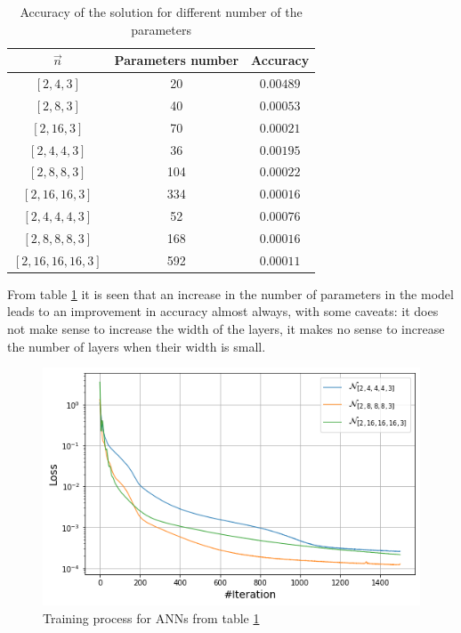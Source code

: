 \begin{table}
	\centering
	\begin{tabular}{| c | c | c |} 
	\hline
		$\vec{n}$ & Parameters number & Accuracy \\ \hline
		$[2, 4, 3]$ & 20 & $0.00489$ \\ \hline
		$[2, 8, 3]$ & 40 & $0.00053$ \\ \hline
		$[2, 16, 3]$ & 70 & $0.00021$ \\ \hline
		$[2, 4, 4, 3]$ & 36 & $0.00195$ \\ \hline
		$[2, 8, 8, 3]$ & 104 & $0.00022$ \\ \hline
		$[2, 16, 16, 3]$ & 334 & $0.00016$ \\ \hline
		$[2, 4, 4, 4, 3]$ & 52 & $0.00076$ \\ \hline
		$[2, 8, 8, 8, 3]$ & 168 & $0.00016$ \\ \hline
		$[2, 16, 16, 16, 3]$ & 592 & $0.00011$ \\ \hline
	\end{tabular}
	\caption{Accuracy of the solution for different number of the parameters}
	\label{table:stokes_tab}
\end{table}

From table \ref{table:stokes_tab} it is seen that an increase in the number of parameters in the model leads to an improvement in accuracy almost always, with some caveats: it does not make sense to increase the width of the layers, it makes no sense to increase the number of layers when their width is small.

\begin{figure}
	\centering
	\includegraphics[width=\textwidth]{images/chapter3/stokes_simple_nets_train.png}
	\caption{Training process for ANNs from table \ref{table:stokes_tab}}
	\label{fig:stokes_simple_nets_train}\tabularnewline
\end{figure}

